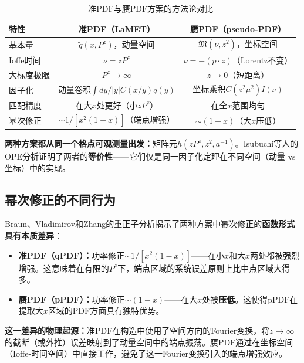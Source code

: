 \documentclass[12pt,a4paper]{ctexart}
\theoremstyle{definition}
\begin{document}
\begin{table}[H]
\centering
\caption{准PDF与赝PDF方案的方法论对比}
\label{tab:quasi_vs_pseudo}
\begin{tabular}{lcc}
\toprule
特性 & 准PDF（LaMET） & 赝PDF（pseudo-PDF） \\
\midrule
基本量 & $\tilde{q}(x, P^z)$，动量空间 & $\mathfrak{M}(\nu, z^2)$，坐标空间 \\
Ioffe时间 & $\nu = zP^z$ & $\nu = -(p\cdot z)$（Lorentz不变） \\
大标度极限 & $P^z \to \infty$ & $z \to 0$（短距离） \\
因子化 & 动量卷积$\int dy/|y| C(x/y) q(y)$ & 坐标乘积$C(z^2\mu^2) I(\nu)$ \\
匹配精度 & 在大$x$处更好（小$zP^z$） & 在全$x$范围均匀 \\
幂次修正 & $\sim 1/[x^2(1-x)]$（端点增强）\cite{Braun2019power} & $\sim (1-x)$（大$x$压低）\cite{Braun2019power} \\
\bottomrule
\end{tabular}
\end{table}

\textbf{两种方案都从同一个格点可观测量出发：}矩阵元$h(zP^z, z^2, a^{-1})$。Isubuchi等人\cite{Izubuchi2018}的OPE分析证明了两者的\textbf{等价性}——它们仅是同一因子化定理在不同空间（动量 vs 坐标）中的实现。

\subsection{幂次修正的不同行为}

Braun、Vladimirov和Zhang\cite{Braun2019power}的重正子分析揭示了两种方案中幂次修正的\textbf{函数形式具有本质差异}：

\begin{itemize}
    \item \textbf{准PDF（qPDF）：}功率修正$\sim 1/[x^2(1-x)]$——在小$x$和大$x$两处都被强烈增强。这意味着在有限的$P^z$下，端点区域的系统误差原则上比中点区域大得多\cite{Braun2019power}。

    \item \textbf{赝PDF（pPDF）：}功率修正$\sim (1-x)$——在大$x$处被\textbf{压低}。这使得pPDF在提取大$x$区域的PDF方面具有独特优势\cite{Braun2019power}。
\end{itemize}

\textbf{这一差异的物理起源：}准PDF在构造中使用了空间方向的Fourier变换，将$z \to \infty$的截断（或外推）误差映射到了动量空间中的端点振荡。赝PDF通过在坐标空间（Ioffe-时间空间）中直接工作，避免了这一Fourier变换引入的端点增强效应。
\end{document}
